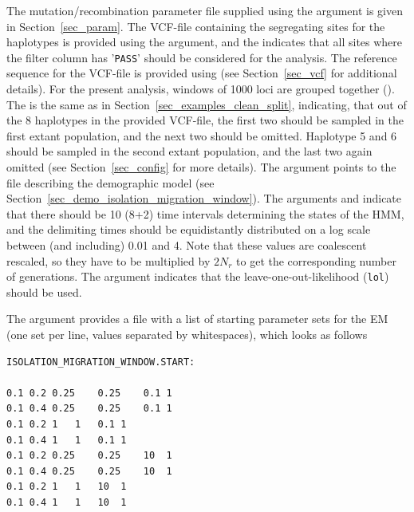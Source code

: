 \documentclass{article}
\numberwithin{equation}{section}
\begin{document}
The mutation/recombination parameter file supplied using the  argument is given in Section~\ref{sec_param}. The VCF-file containing the segregating sites for the haplotypes is provided using the  argument, and the  indicates that all sites where the filter column has '\texttt{PASS}' should be considered for the analysis. The reference sequence for the VCF-file is provided using  (see Section~\ref{sec_vcf} for additional details). For the present analysis, windows of 1000 loci are grouped together (). The  is the same as in Section~\ref{sec_examples_clean_split}, indicating, that out of the 8 haplotypes in the provided VCF-file, the first two should be sampled in the first extant population, and the next two should be omitted. Haplotype 5 and 6 should be sampled in the second extant population, and the last two again omitted (see Section~\ref{sec_config} for more details). The argument  points to the file describing the demographic model (see Section~\ref{sec_demo_isolation_migration_window}). The arguments  and  indicate that there should be 10 (8+2) time intervals determining the states of the HMM, and the delimiting times should be equidistantly distributed on a log scale between (and including) 0.01 and 4. Note that these values are coalescent rescaled, so they have to be multiplied by $2N_r$ to get the corresponding number of generations. The argument  indicates that the leave-one-out-likelihood (\texttt{lol}) should be used.

The argument  provides a file with a list of starting parameter sets for the EM (one set per line, values separated by whitespaces), which looks as follows

\begin{verbatim}
ISOLATION_MIGRATION_WINDOW.START:

0.1	0.2	0.25	0.25	0.1	1
0.1	0.4	0.25	0.25	0.1	1
0.1	0.2	1	1	0.1	1
0.1	0.4	1	1	0.1	1
0.1	0.2	0.25	0.25	10	1
0.1	0.4	0.25	0.25	10	1
0.1	0.2	1	1	10	1
0.1	0.4	1	1	10	1
\end{verbatim}
\end{document}

